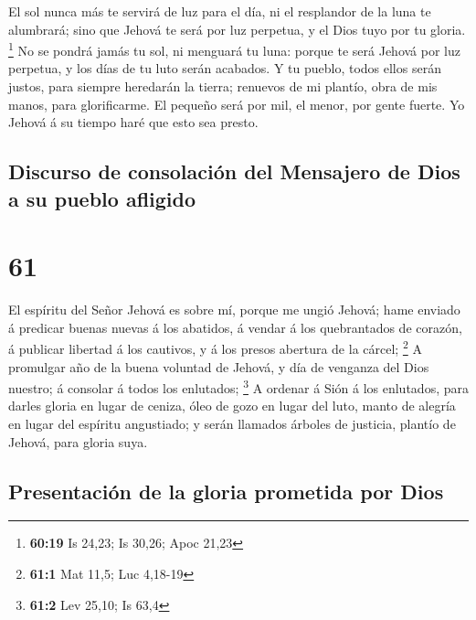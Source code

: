  El sol nunca más te servirá de luz para el día, ni el
resplandor de la luna te alumbrará; sino que Jehová te será por luz
perpetua, y el Dios tuyo por tu gloria. \footnote{\textbf{60:19} Is
  24,23; Is 30,26; Apoc 21,23}  No se pondrá jamás tu
sol, ni menguará tu luna: porque te será Jehová por luz perpetua, y los
días de tu luto serán acabados.  Y tu pueblo, todos ellos
serán justos, para siempre heredarán la tierra; renuevos de mi plantío,
obra de mis manos, para glorificarme.  El pequeño será
por mil, el menor, por gente fuerte. Yo Jehová á su tiempo haré que esto
sea presto.

\hypertarget{discurso-de-consolaciuxf3n-del-mensajero-de-dios-a-su-pueblo-afligido}{%
\subsection{Discurso de consolación del Mensajero de Dios a su pueblo
afligido}\label{discurso-de-consolaciuxf3n-del-mensajero-de-dios-a-su-pueblo-afligido}}

\hypertarget{section-60}{%
\section{61}\label{section-60}}

 El espíritu del Señor Jehová es sobre mí, porque me ungió
Jehová; hame enviado á predicar buenas nuevas á los abatidos, á vendar á
los quebrantados de corazón, á publicar libertad á los cautivos, y á los
presos abertura de la cárcel; \footnote{\textbf{61:1} Mat 11,5; Luc
  4,18-19}  A promulgar año de la buena voluntad de
Jehová, y día de venganza del Dios nuestro; á consolar á todos los
enlutados; \footnote{\textbf{61:2} Lev 25,10; Is 63,4}  A
ordenar á Sión á los enlutados, para darles gloria en lugar de ceniza,
óleo de gozo en lugar del luto, manto de alegría en lugar del espíritu
angustiado; y serán llamados árboles de justicia, plantío de Jehová,
para gloria suya.

\hypertarget{presentaciuxf3n-de-la-gloria-prometida-por-dios}{%
\subsection{Presentación de la gloria prometida por
Dios}\label{presentaciuxf3n-de-la-gloria-prometida-por-dios}}


